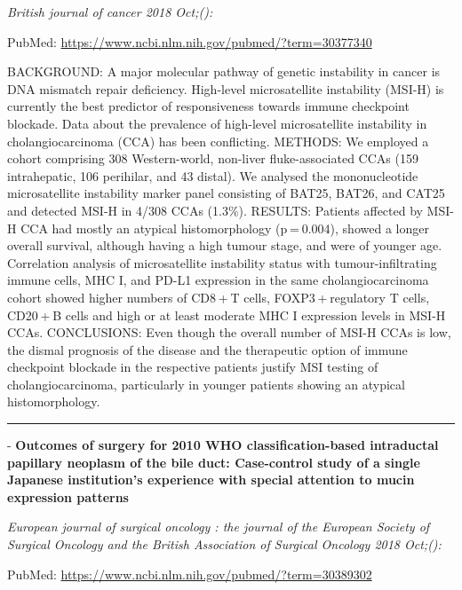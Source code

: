 \documentclass[]{article}
\begin{document}
\emph{British journal of cancer 2018 Oct;():}

PubMed: \url{https://www.ncbi.nlm.nih.gov/pubmed/?term=30377340}

BACKGROUND: A major molecular pathway of genetic instability in cancer
is DNA mismatch repair deficiency. High-level microsatellite instability
(MSI-H) is currently the best predictor of responsiveness towards immune
checkpoint blockade. Data about the prevalence of high-level
microsatellite instability in cholangiocarcinoma (CCA) has been
conflicting. METHODS: We employed a cohort comprising 308 Western-world,
non-liver fluke-associated CCAs (159 intrahepatic, 106 perihilar, and 43
distal). We analysed the mononucleotide microsatellite instability
marker panel consisting of BAT25, BAT26, and CAT25 and detected MSI-H in
4/308 CCAs (1.3\%). RESULTS: Patients affected by MSI-H CCA had mostly
an atypical histomorphology (p = 0.004), showed a longer overall
survival, although having a high tumour stage, and were of younger age.
Correlation analysis of microsatellite instability status with
tumour-infiltrating immune cells, MHC I, and PD-L1 expression in the
same cholangiocarcinoma cohort showed higher numbers of CD8 + T cells,
FOXP3 + regulatory T cells, CD20 + B cells and high or at least moderate
MHC I expression levels in MSI-H CCAs. CONCLUSIONS: Even though the
overall number of MSI-H CCAs is low, the dismal prognosis of the disease
and the therapeutic option of immune checkpoint blockade in the
respective patients justify MSI testing of cholangiocarcinoma,
particularly in younger patients showing an atypical histomorphology.

{}

{}

\begin{center}\rule{0.5\linewidth}{\linethickness}\end{center}

 - \textbf{Outcomes of surgery for 2010 WHO classification-based
intraductal papillary neoplasm of the bile duct: Case-control study of a
single Japanese institution's experience with special attention to mucin
expression patterns}

\emph{European journal of surgical oncology : the journal of the
European Society of Surgical Oncology and the British Association of
Surgical Oncology 2018 Oct;():}

PubMed: \url{https://www.ncbi.nlm.nih.gov/pubmed/?term=30389302}
\end{document}
